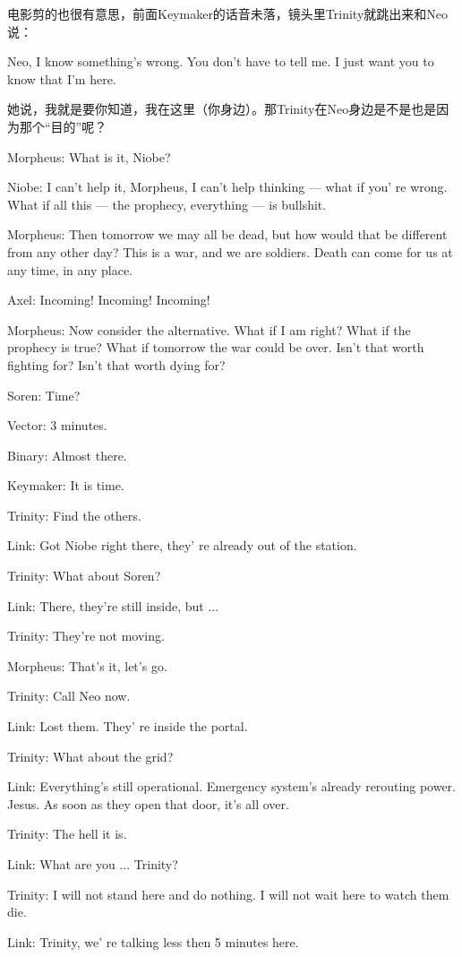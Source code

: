 \documentclass[UTF8]{ctexart}
\newenvironment{myquote}{\color{green} \setlength{\leftskip}{6em} \setlength{\rightskip}{4em} \setlength{\parindent}{-2em}}{\par}
\begin{document}
电影剪的也很有意思，前面Keymaker的话音未落，镜头里Trinity就跳出来和Neo说：

Neo, I know something's wrong. You don't have to tell me. I just want you to know that I'm here.

她说，我就是要你知道，我在这里（你身边）。那Trinity在Neo身边是不是也是因为那个“目的”呢？

\begin{myquote}
Morpheus: What is it, Niobe?

Niobe: I can't help it, Morpheus, I can't help thinking --- what if you' re wrong. What if all this --- the prophecy, everything --- is bullshit.

Morpheus: Then tomorrow we may all be dead, but how would that be different from any other day? This is a war, and we are soldiers. Death can come for us at any time, in any place.

Axel: Incoming! Incoming! Incoming!

Morpheus: Now consider the alternative. What if I am right? What if the prophecy is true? What if tomorrow the war could be over. Isn't that worth fighting for? Isn't that worth dying for?

Soren: Time?

Vector: 3 minutes.

Binary: Almost there.

Keymaker: It is time.

Trinity: Find the others.

Link: Got Niobe right there, they' re already out of the station.

Trinity: What about Soren?

Link: There, they're still inside, but ...

Trinity: They're not moving.

Morpheus: That's it, let's go.

Trinity: Call Neo now.

Link: Lost them. They' re inside the portal.

Trinity: What about the grid?

Link: Everything's still operational. Emergency system's already rerouting power. Jesus. As soon as they open that door, it's all over.

Trinity: The hell it is.

Link: What are you ... Trinity?

Trinity: I will not stand here and do nothing. I will not wait here to watch them die.

Link: Trinity, we' re talking less then 5 minutes here.


\end{myquote}
\end{document}
